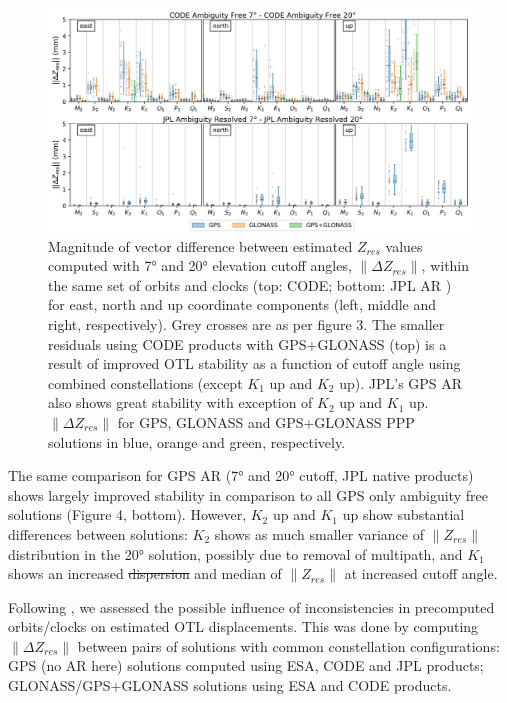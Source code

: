 \documentclass[se, manuscript]{copernicus}
\providecommand{\DIFadd}[1]{{\protect\color{blue}\uwave{#1}}} %
\providecommand{\DIFdel}[1]{{\protect\color{red}\sout{#1}}}                      %
\providecommand{\DIFaddbegin}{} %
\providecommand{\DIFaddend}{} %
\providecommand{\DIFdelbegin}{} %
\providecommand{\DIFdelend}{} %
\begin{document}
\begin{figure}[t]
\includegraphics[width=17cm]{fig04.png}
\caption{Magnitude of vector difference between estimated $Z_{res}$ values computed with 7° and 20° elevation cutoff angles, $\|\Delta Z_{res}\|$, within the same set of orbits and clocks (top: CODE; bottom: JPL AR ) for east, north and up coordinate components (left, middle and right, respectively). Grey crosses are as per figure 3. The smaller residuals using CODE products with GPS+GLONASS (top) is a result of improved OTL stability as a function of cutoff angle using combined constellations (except $K_1$ up and $K_2$ up). JPL’s GPS AR also shows great stability with exception of $K_2$ up and $K_1$ up. $\|\Delta Z_{res}\|$ for GPS, GLONASS and GPS+GLONASS PPP solutions in blue, orange and green, respectively.}
\end{figure}

The same comparison for GPS AR (7° and 20° cutoff, JPL native products) shows largely improved stability in comparison to all GPS only ambiguity free solutions (Figure 4, bottom). However, $K_2$ up and $K_1$ up show substantial differences between solutions: $K_2$ shows as much smaller variance of $\|Z_{res}\|$ distribution in the 20° solution, possibly due to removal of multipath, and $K_1$ shows an increased \DIFdelbegin \DIFdel{dispersion }\DIFdelend \DIFaddbegin \DIFadd{variance }\DIFaddend and median of $\|Z_{res}\|$ at increased cutoff angle. 

Following \cite{Yuan2013}, we assessed the possible influence of inconsistencies in precomputed orbits/clocks on estimated OTL displacements. This was done by computing $\|\Delta Z_{res}\|$ between pairs of solutions with common constellation configurations: GPS (no AR here) solutions computed using ESA, CODE and JPL products; GLONASS/GPS+GLONASS solutions using ESA and CODE products. \DIFdelbegin %
\end{document}
